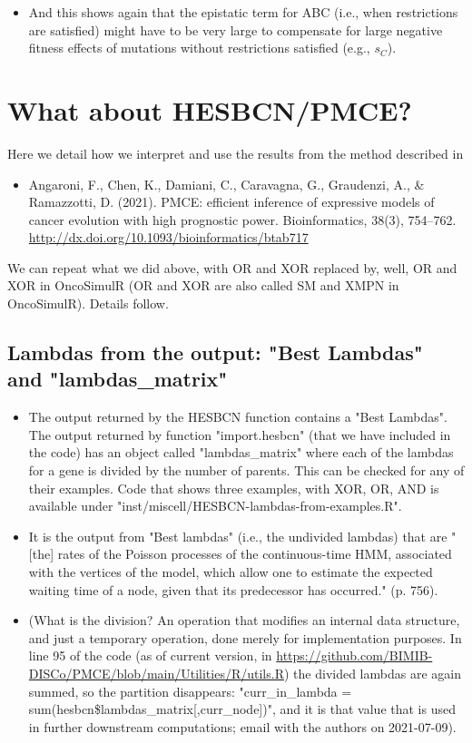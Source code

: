 \documentclass[11pt]{article}
\begin{document}
\begin{itemize}
\begin{itemize}
\item And this shows again that the epistatic term for ABC (i.e., when restrictions are satisfied) might have to be very large to compensate for large negative fitness effects of mutations without restrictions satisfied (e.g., \(s_C\)).
\end{itemize}
\end{itemize}





\section{What about HESBCN/PMCE?}
\label{sec:org1904b6b}
Here we detail how we interpret and use the results from the method described in 

\begin{itemize}
\item Angaroni, F., Chen, K., Damiani, C., Caravagna, G., Graudenzi, A., \& Ramazzotti, D. (2021). PMCE: efficient inference of expressive models of cancer evolution with high prognostic power. Bioinformatics, 38(3), 754–762. \url{http://dx.doi.org/10.1093/bioinformatics/btab717}
\end{itemize}

We can repeat what we did above, with OR and XOR replaced by, well, OR and XOR in OncoSimulR (OR and XOR are also called SM and XMPN in OncoSimulR). Details follow.

\subsection{Lambdas from the output: "Best Lambdas" and "lambdas\_matrix"}
\label{sec:orgd732357}
\begin{itemize}
\item The output returned by the HESBCN function contains a "Best Lambdas". The output returned by function "import.hesbcn" (that we have included in the code) has an object called "lambdas\_matrix" where each of the lambdas for a gene is divided by the number of parents. This can be checked for any of their examples. Code that shows three examples, with XOR, OR, AND is available under "inst/miscell/HESBCN-lambdas-from-examples.R".
\item It is the output from "Best lambdas" (i.e., the undivided lambdas) that are "[the] rates of the Poisson processes of the continuous-time HMM, associated with the vertices of the model, which allow one to estimate the expected waiting time of a node, given that its predecessor has occurred." (p. 756).
\item (What is the division? An  operation that modifies an internal data structure, and just a temporary operation, done merely for implementation purposes. In line 95 of the code (as of current version, in \url{https://github.com/BIMIB-DISCo/PMCE/blob/main/Utilities/R/utils.R}) the divided lambdas are again summed, so the partition disappears: "curr\_in\_lambda = sum(hesbcn\$lambdas\_matrix[,curr\_node])", and it is that value that is used in further downstream computations;  email with the authors on 2021-07-09).
\end{itemize}
\end{document}
